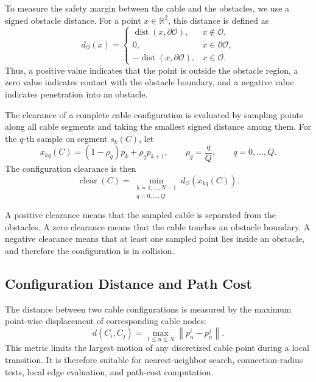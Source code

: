 \documentclass{pas}
\begin{document}
To measure the safety margin between the cable and the obstacles, we use a signed obstacle distance. For a point \(x\in\mathbb{R}^{2}\), this distance is defined as
\begin{equation}
d_{\mathcal{O}}(x)
=
\begin{cases}
\operatorname{dist}(x,\partial\mathcal{O}), & x\notin\mathcal{O},\\
0, & x\in\partial\mathcal{O},\\
-\operatorname{dist}(x,\partial\mathcal{O}), & x\in\mathcal{O}.
\end{cases}
\label{eq:signed_obstacle_distance}
\end{equation}
Thus, a positive value indicates that the point is outside the obstacle region, a zero value indicates contact with the obstacle boundary, and a negative value indicates penetration into an obstacle.

The clearance of a complete cable configuration is evaluated by sampling points along all cable segments and taking the smallest signed distance among them. For the \(q\)-th sample on segment \(s_k(C)\), let
\[
x_{kq}(C)
=
(1-\rho_q)p_k+\rho_q p_{k+1},
\qquad
\rho_q=\frac{q}{Q},
\qquad
q=0,\ldots,Q.
\]
The configuration clearance is then
\begin{equation}
\operatorname{clear}(C)
=
\min_{\substack{k=1,\ldots,N-1\\ q=0,\ldots,Q}}
d_{\mathcal{O}}\!\left(x_{kq}(C)\right).
\label{eq:configuration_clearance}
\end{equation}

A positive clearance means that the sampled cable is separated from the obstacles. A zero clearance means that the cable touches an obstacle boundary. A negative clearance means that at least one sampled point lies inside an obstacle, and therefore the configuration is in collision.

\subsection{Configuration Distance and Path Cost}
\label{subsec:distance_path_cost}

The distance between two cable configurations is measured by the maximum
point-wise displacement of corresponding cable nodes:
\begin{equation}
d(C_i,C_j)
=
\max_{1\leq n\leq N}
\left\|
p_n^{i}-p_n^{j}
\right\|.
\label{eq:configuration_distance_metric}
\end{equation}
This metric limits the largest motion of any discretized cable point during a
local transition. It is therefore suitable for nearest-neighbor search,
connection-radius tests, local edge evaluation, and path-cost computation.
\end{document}
